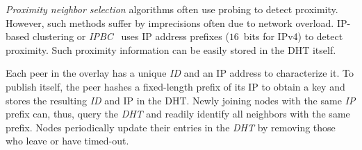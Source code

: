 \emph{Proximity neighbor selection} algorithms often 
use probing to detect proximity. 
However, such methods suffer by imprecisions often due to network overload.
IP-based clustering or \emph{IPBC}~\cite{KM2007} uses IP address prefixes
($16$~bits for IPv4) to detect proximity.
Such proximity information 
can be easily stored in the DHT itself.

Each peer in the overlay has a unique \emph{ID} and an IP address to
characterize it. 
To publish itself, the peer hashes a fixed-length prefix of 
its IP to obtain a key and stores the resulting \emph{ID} and IP 
in the DHT. 
Newly joining nodes with the same {\sl IP} prefix 
can, thus, query the \emph{DHT} and readily identify all 
neighbors with the same prefix. 
Nodes periodically update their entries in the \emph{DHT} 
by removing those who leave or have timed-out.

